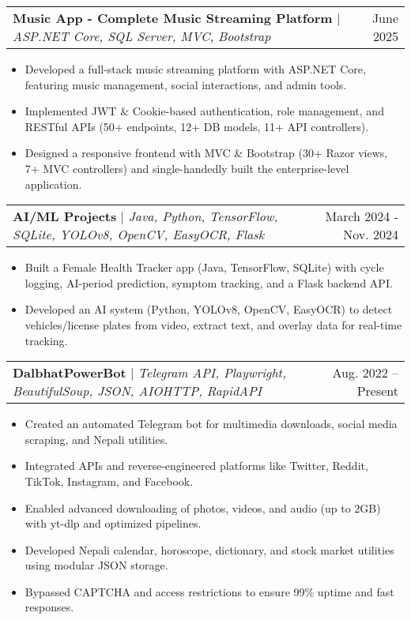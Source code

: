 \documentclass[letterpaper,11pt]{article}
\makeatletter
\newcommand{\resumeItem}[1]{
  \item\small{
    {#1 \vspace{-2pt}}
  }
}
\newcommand{\resumeProjectHeading}[2]{
    \item
    \begin{tabular*}{0.97\textwidth}{l@{\extracolsep{\fill}}r}
      \small#1 & #2 \\
    \end{tabular*}\vspace{-7pt}
}
\newcommand{\resumeItemListStart}{\begin{itemize}}
\newcommand{\resumeItemListEnd}{\end{itemize}\vspace{-5pt}}
\makeatother
\begin{document}
    \begin{minipage}{\textwidth}
    \resumeProjectHeading
        {\textbf{Music App - Complete Music Streaming Platform} $|$ \footnotesize\emph{ASP.NET Core, SQL Server, MVC, Bootstrap}}{June 2025}
        \resumeItemListStart
            \resumeItem{Developed a full-stack music streaming platform with ASP.NET Core, featuring music management, social interactions, and admin tools.}
            \resumeItem{Implemented JWT \& Cookie-based authentication, role management, and RESTful APIs (50+ endpoints, 12+ DB models, 11+ API controllers).}
            \resumeItem{Designed a responsive frontend with MVC \& Bootstrap (30+ Razor views, 7+ MVC controllers) and single-handedly built the enterprise-level application.}
        \resumeItemListEnd
    \end{minipage}

    \begin{minipage}{\textwidth}
    \resumeProjectHeading
        {\textbf{AI/ML Projects} $|$ \footnotesize\emph{Java, Python, TensorFlow, SQLite, YOLOv8, OpenCV, EasyOCR, Flask}}{March 2024 - Nov. 2024}
        \resumeItemListStart
            \resumeItem{Built a Female Health Tracker app (Java, TensorFlow, SQLite) with cycle logging, AI-period prediction, symptom tracking, and a Flask backend API.}
            \resumeItem{Developed an AI system (Python, YOLOv8, OpenCV, EasyOCR) to detect vehicles/license plates from video, extract text, and overlay data for real-time tracking.}
        \resumeItemListEnd
    \end{minipage}

    \begin{minipage}{\textwidth}
    \resumeProjectHeading
        {\textbf{DalbhatPowerBot} $|$ \footnotesize\emph{Telegram API, Playwright, BeautifulSoup, JSON, AIOHTTP, RapidAPI}}{Aug. 2022 -- Present}
        \resumeItemListStart
            \resumeItem{Created an automated Telegram bot for multimedia downloads, social media scraping, and Nepali utilities.}
            \resumeItem{Integrated APIs and reverse-engineered platforms like Twitter, Reddit, TikTok, Instagram, and Facebook.}
            \resumeItem{Enabled advanced downloading of photos, videos, and audio (up to 2GB) with yt-dlp and optimized pipelines.}
            \resumeItem{Developed Nepali calendar, horoscope, dictionary, and stock market utilities using modular JSON storage.}
            \resumeItem{Bypassed CAPTCHA and access restrictions to ensure 99\% uptime and fast responses.}
        \resumeItemListEnd
    \end{minipage}
          
\end{document}
